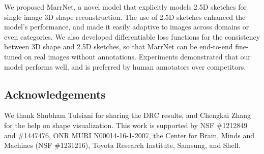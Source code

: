 \documentclass{article}
\newcommand{\model}{MarrNet\xspace}
\begin{document}
We proposed \model, a novel model that explicitly models 2.5D sketches for single image 3D shape reconstruction. The use of 2.5D sketches enhanced the model's performance, and made it easily adaptive to images across domains or even categories. We also developed differentiable loss functions for the consistency between 3D shape and 2.5D sketches, so that \model can be end-to-end fine-tuned on real images without annotations.  Experiments demonstrated that our model performs well, and is preferred by human annotators over competitors.

 
\subsection*{Acknowledgements}

We thank Shubham Tulsiani for sharing the DRC results, and Chengkai Zhang for the help on shape visualization. This work is supported by NSF \#1212849 and \#1447476, ONR MURI N00014-16-1-2007, the Center for Brain, Minds and Machines (NSF \#1231216), Toyota Research Institute, Samsung, and Shell.

\small
{


}
\end{document}
